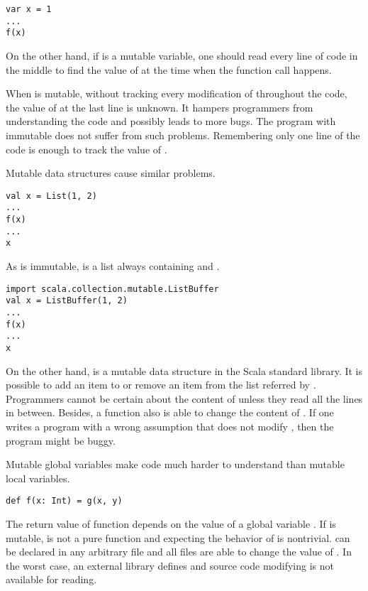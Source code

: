 \begin{verbatim}
var x = 1
...
f(x)
\end{verbatim}

On the other hand, if  is a mutable variable, one should read every line
of code in the middle to find the value of  at the time when the function
call happens.

When  is mutable, without tracking every
modification of  throughout the code, the value of  at the last
line is unknown. It hampers programmers from understanding the code
and possibly leads to more bugs.
The program with immutable  does not suffer from such problems.
Remembering only one line of the code is enough to track the value of .

Mutable data structures cause similar problems.

\begin{verbatim}
val x = List(1, 2)
...
f(x)
...
x
\end{verbatim}

As  is immutable,
 is a list always containing  and .

\begin{verbatim}
import scala.collection.mutable.ListBuffer
val x = ListBuffer(1, 2)
...
f(x)
...
x
\end{verbatim}

On the other hand,  is a mutable data structure in the Scala
standard library. It is possible to add an item to or remove an item from the
list referred by . Programmers cannot be certain about the content of 
unless they read all the lines in between. Besides, a function  also is
able to change the content of . If one writes a program with a wrong
assumption that  does not modify , then the program might be
buggy.

Mutable global variables make code much harder to understand than mutable local
variables.

\begin{verbatim}
def f(x: Int) = g(x, y)
\end{verbatim}

The return value of function  depends on the value of a global variable
. If  is mutable,  is not a pure function and expecting
the behavior of  is nontrivial.  can be declared in any arbitrary
file and all files are able to change the value of .
In the worst case, an external library defines  and source code
modifying  is not available for reading.

